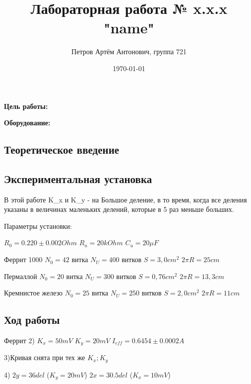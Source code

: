 \documentclass[a4paper,12pt]{article}
\author{Петров Артём Антонович, группа 721}
\title{Лабораторная работа № x.x.x "name"}
\date{\today}
\begin{document}

\begin{minipage}[t][7cm]{\textwidth}
\maketitle
\end{minipage}


\textbf{Цель работы:} 
\bigskip

\medskip
\textbf{Оборудование:} 
\bigskip

\subsection*{Теоретическое введение}
\bigskip


\bigskip

\subsection*{Экспериментальная установка}
\bigskip

В этой работе K_x и K_y - на Большое деление, в то время, когда все деления указаны в величинах маленьких делений, которые в 5 раз меньше больших.

Параметры установки:

$R_0 = 0.220 \pm 0.002 Ohm$
$R_u = 20kOhm$
$C_u = 20 \mu F$

Феррит 1000
$N_0 = 42$ витка
$N_U = 400 $ витков
$S = 3,0 cm^2$
$2\pi R = 25 cm$

Пермаллой
$N_0 = 20$ витка
$N_U = 300 $ витков
$S = 0,76 cm^2$
$2\pi R = 13,3 cm$

Кремнистое железо
$N_0 = 25$ витка
$N_U = 250 $ витков
$S = 2,0 cm^2$
$2\pi R = 11 cm$



\bigskip

\subsection*{Ход работы}
\bigskip


Феррит
2)
$K_x = 50mV$
$K_y = 20mV$
$I_{eff} = 0.6454 \pm 0.0002 A$

3)Кривая снята при тех же $K_x; K_y$

4)
$2y = 36 del$
($K_y = 20mV$)
$2x = 30.5 del$
($K_x = 10 mV$)
\end{document}
